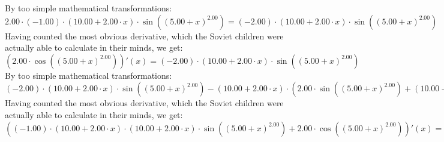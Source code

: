 \documentclass{article}
\begin{document}
By too simple mathematical transformations:
 ${{2.00} \cdot {\left({-1.00}\right) \cdot {\left({{10.00} + {{2.00} \cdot {x}}}\right) \cdot  \sin {\left({\left({{5.00} + {x}}\right) ^ {2.00}}\right)} }}} = {\left({-2.00}\right) \cdot {\left({{10.00} + {{2.00} \cdot {x}}}\right) \cdot  \sin {\left({\left({{5.00} + {x}}\right) ^ {2.00}}\right)} }}$ 
 \newline
 \newline 
Having counted the most obvious derivative, which the Soviet children were actually able to calculate in their minds, we get:
$({{2.00} \cdot  \cos {\left({\left({{5.00} + {x}}\right) ^ {2.00}}\right)} })'(x) = {\left({-2.00}\right) \cdot {\left({{10.00} + {{2.00} \cdot {x}}}\right) \cdot  \sin {\left({\left({{5.00} + {x}}\right) ^ {2.00}}\right)} }}$\newline
\newline
By too simple mathematical transformations:
 ${{{\left({-2.00}\right) \cdot {\left({{10.00} + {{2.00} \cdot {x}}}\right) \cdot  \sin {\left({\left({{5.00} + {x}}\right) ^ {2.00}}\right)} }} - {\left({{10.00} + {{2.00} \cdot {x}}}\right) \cdot \left({{{2.00} \cdot  \sin {\left({\left({{5.00} + {x}}\right) ^ {2.00}}\right)} } + {\left({{10.00} + {{2.00} \cdot {x}}}\right) \cdot { \cos {\left({\left({{5.00} + {x}}\right) ^ {2.00}}\right)}  \cdot \left({{10.00} + {{2.00} \cdot {x}}}\right)}}}\right)}} + {\left({-2.00}\right) \cdot {\left({{10.00} + {{2.00} \cdot {x}}}\right) \cdot  \sin {\left({\left({{5.00} + {x}}\right) ^ {2.00}}\right)} }}} = {{{\left({-2.00}\right) \cdot {\left({{10.00} + {{2.00} \cdot {x}}}\right) \cdot  \sin {\left({\left({{5.00} + {x}}\right) ^ {2.00}}\right)} }} - {\left({{10.00} + {{2.00} \cdot {x}}}\right) \cdot \left({{{2.00} \cdot  \sin {\left({\left({{5.00} + {x}}\right) ^ {2.00}}\right)} } + {\left({{10.00} + {{2.00} \cdot {x}}}\right) \cdot { \cos {\left({\left({{5.00} + {x}}\right) ^ {2.00}}\right)}  \cdot \left({{10.00} + {{2.00} \cdot {x}}}\right)}}}\right)}} - {{2.00} \cdot {\left({{10.00} + {{2.00} \cdot {x}}}\right) \cdot  \sin {\left({\left({{5.00} + {x}}\right) ^ {2.00}}\right)} }}}$ 
 \newline
 \newline 
Having counted the most obvious derivative, which the Soviet children were actually able to calculate in their minds, we get:
$({{\left({-1.00}\right) \cdot {\left({{10.00} + {{2.00} \cdot {x}}}\right) \cdot {\left({{10.00} + {{2.00} \cdot {x}}}\right) \cdot  \sin {\left({\left({{5.00} + {x}}\right) ^ {2.00}}\right)} }}} + {{2.00} \cdot  \cos {\left({\left({{5.00} + {x}}\right) ^ {2.00}}\right)} }})'(x) = {{{\left({-2.00}\right) \cdot {\left({{10.00} + {{2.00} \cdot {x}}}\right) \cdot  \sin {\left({\left({{5.00} + {x}}\right) ^ {2.00}}\right)} }} - {\left({{10.00} + {{2.00} \cdot {x}}}\right) \cdot \left({{{2.00} \cdot  \sin {\left({\left({{5.00} + {x}}\right) ^ {2.00}}\right)} } + {\left({{10.00} + {{2.00} \cdot {x}}}\right) \cdot { \cos {\left({\left({{5.00} + {x}}\right) ^ {2.00}}\right)}  \cdot \left({{10.00} + {{2.00} \cdot {x}}}\right)}}}\right)}} - {{2.00} \cdot {\left({{10.00} + {{2.00} \cdot {x}}}\right) \cdot  \sin {\left({\left({{5.00} + {x}}\right) ^ {2.00}}\right)} }}}$\newline
\end{document}
